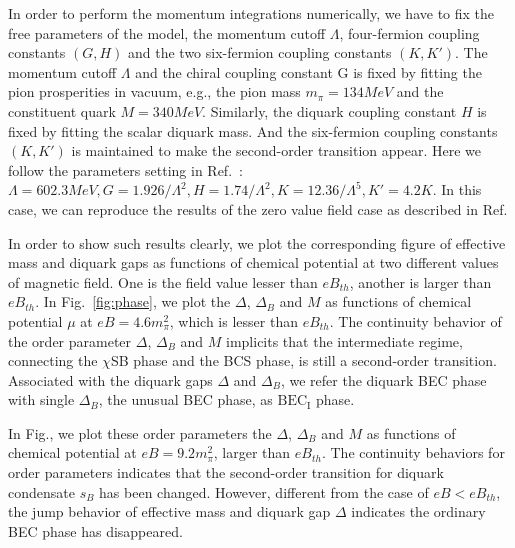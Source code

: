 \documentclass[prd, showpacs,nofootinbib,amsmath,amssymb]{revtex4}
\begin{document}
In order to perform the momentum integrations numerically, we have to fix the free parameters
of the model, the momentum cutoff $\Lambda$, four-fermion coupling constants $(G,H)$ and the two
six-fermion coupling constants $(K, K')$.
The momentum cutoff $\Lambda$ and the chiral coupling constant G is fixed by fitting the pion prosperities in vacuum, e.g., the pion mass $m_\pi = 134 MeV$ and the constituent quark $M = 340 MeV$.
Similarly, the diquark coupling constant $H$ is fixed by fitting the scalar diquark mass.
And the six-fermion coupling constants $(K, K')$ is maintained to make the second-order transition appear.
Here we  follow the parameters setting in Ref.~\cite{abuki2010nambu}:
$\Lambda = 602.3 MeV,
G  = 1.926/\Lambda^2,
H  = 1.74/\Lambda^2,
K  = 12.36/\Lambda^5,
K' = 4.2K$.
In this case, we can reproduce  the results of the zero value field case as described in Ref.






In order to show such results  clearly,  we plot the corresponding figure of effective mass and diquark gaps as functions of chemical potential at two different values of magnetic field.
One is the field value lesser than $eB_{th}$, another is larger than $eB_{th}$.
In Fig.~\ref{fig:phase},
we plot the $\Delta$, $\Delta_B$ and  $M$ as functions of
chemical potential $\mu$  at $eB = 4.6 m_\pi^2$, which is lesser than $eB_{th}$.
The continuity behavior of the order parameter  $\Delta$, $\Delta_B$ and  $M$  implicits that the intermediate regime, connecting the $\chi$SB phase and the BCS phase, is still a second-order transition.
Associated with  the diquark gaps  $\Delta$ and  $\Delta_B$, we  refer the diquark BEC phase with single $\Delta_B$, the unusual BEC phase, as
 $\text{BEC}_\text{I}$ phase.

In Fig.,  we plot these order parameters the $\Delta$, $\Delta_B$ and  $M$ as functions of
chemical potential at $ eB = 9.2 m_\pi^2$, larger than $eB_{th}$. The continuity behaviors for order parameters indicates that
the second-order transition for diquark condensate $s_B$ has been changed.
However, different from the case of $eB < eB_{th}$,  the jump behavior of effective mass and diquark gap $\Delta$  indicates the ordinary BEC phase has disappeared.
\end{document}
